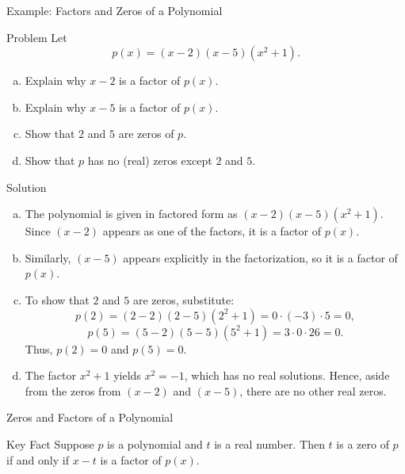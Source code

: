 \begin{frame}{Example: Factors and Zeros of a Polynomial}
  \begin{exampleblock}{Problem}
    Let 
    \[
      p(x) = (x-2)(x-5)(x^2+1).
    \]
    \begin{enumerate}[(a)]
      \item Explain why \(x-2\) is a factor of \(p(x)\).
      \item Explain why \(x-5\) is a factor of \(p(x)\).
      \item Show that \(2\) and \(5\) are zeros of \(p\).
      \item Show that \(p\) has no (real) zeros except \(2\) and \(5\).
    \end{enumerate}
  \end{exampleblock}
\end{frame}
\begin{frame}
  \begin{block}{Solution}
    \begin{enumerate}[(a)]
      \item The polynomial is given in factored form as \((x-2)(x-5)(x^2+1)\). Since \((x-2)\) appears as one of the factors, it is a factor of \(p(x)\).
      \item Similarly, \((x-5)\) appears explicitly in the factorization, so it is a factor of \(p(x)\).
      \item To show that \(2\) and \(5\) are zeros, substitute:
        \[
          p(2) = (2-2)(2-5)(2^2+1) = 0\cdot(-3)\cdot5 = 0,
        \]
        \[
          p(5) = (5-2)(5-5)(5^2+1) = 3\cdot0\cdot26 = 0.
        \]
        Thus, \(p(2)=0\) and \(p(5)=0\).
      \item The factor \(x^2+1\) yields \(x^2=-1\), which has no real solutions. Hence, aside from the zeros from \((x-2)\) and \((x-5)\), there are no other real zeros.
    \end{enumerate}
  \end{block}
\end{frame}

\begin{frame}{Zeros and Factors of a Polynomial}
  \begin{block}{Key Fact}
    Suppose \(p\) is a polynomial and \(t\) is a real number. Then \(t\) is a zero of \(p\) if and only if \(x-t\) is a factor of \(p(x)\).
  \end{block}
\end{frame}

